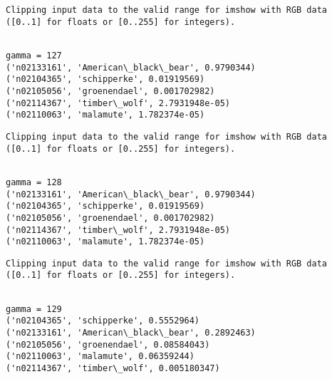 \documentclass[11pt]{article}
\begin{document}
    \begin{Verbatim}[commandchars=\\\{\}]
Clipping input data to the valid range for imshow with RGB data ([0..1] for floats or [0..255] for integers).

    \end{Verbatim}

    \begin{Verbatim}[commandchars=\\\{\}]

gamma = 127
('n02133161', 'American\_black\_bear', 0.9790344)
('n02104365', 'schipperke', 0.01919569)
('n02105056', 'groenendael', 0.001702982)
('n02114367', 'timber\_wolf', 2.7931948e-05)
('n02110063', 'malamute', 1.782374e-05)

    \end{Verbatim}

    \begin{Verbatim}[commandchars=\\\{\}]
Clipping input data to the valid range for imshow with RGB data ([0..1] for floats or [0..255] for integers).

    \end{Verbatim}

    \begin{Verbatim}[commandchars=\\\{\}]

gamma = 128
('n02133161', 'American\_black\_bear', 0.9790344)
('n02104365', 'schipperke', 0.01919569)
('n02105056', 'groenendael', 0.001702982)
('n02114367', 'timber\_wolf', 2.7931948e-05)
('n02110063', 'malamute', 1.782374e-05)

    \end{Verbatim}

    \begin{Verbatim}[commandchars=\\\{\}]
Clipping input data to the valid range for imshow with RGB data ([0..1] for floats or [0..255] for integers).

    \end{Verbatim}

    \begin{Verbatim}[commandchars=\\\{\}]

gamma = 129
('n02104365', 'schipperke', 0.5552964)
('n02133161', 'American\_black\_bear', 0.2892463)
('n02105056', 'groenendael', 0.08584043)
('n02110063', 'malamute', 0.06359244)
('n02114367', 'timber\_wolf', 0.005180347)

    \end{Verbatim}
\end{document}
